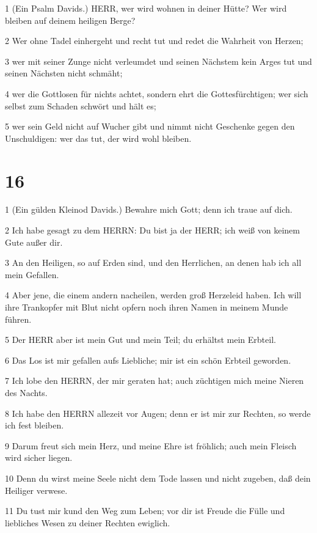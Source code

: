\par 1 (Ein Psalm Davids.) HERR, wer wird wohnen in deiner Hütte? Wer wird bleiben auf deinem heiligen Berge?
\par 2 Wer ohne Tadel einhergeht und recht tut und redet die Wahrheit von Herzen;
\par 3 wer mit seiner Zunge nicht verleumdet und seinen Nächstem kein Arges tut und seinen Nächsten nicht schmäht;
\par 4 wer die Gottlosen für nichts achtet, sondern ehrt die Gottesfürchtigen; wer sich selbst zum Schaden schwört und hält es;
\par 5 wer sein Geld nicht auf Wucher gibt und nimmt nicht Geschenke gegen den Unschuldigen: wer das tut, der wird wohl bleiben.

\chapter{16}

\par 1 (Ein gülden Kleinod Davids.) Bewahre mich Gott; denn ich traue auf dich.
\par 2 Ich habe gesagt zu dem HERRN: Du bist ja der HERR; ich weiß von keinem Gute außer dir.
\par 3 An den Heiligen, so auf Erden sind, und den Herrlichen, an denen hab ich all mein Gefallen.
\par 4 Aber jene, die einem andern nacheilen, werden groß Herzeleid haben. Ich will ihre Trankopfer mit Blut nicht opfern noch ihren Namen in meinem Munde führen.
\par 5 Der HERR aber ist mein Gut und mein Teil; du erhältst mein Erbteil.
\par 6 Das Los ist mir gefallen aufs Liebliche; mir ist ein schön Erbteil geworden.
\par 7 Ich lobe den HERRN, der mir geraten hat; auch züchtigen mich meine Nieren des Nachts.
\par 8 Ich habe den HERRN allezeit vor Augen; denn er ist mir zur Rechten, so werde ich fest bleiben.
\par 9 Darum freut sich mein Herz, und meine Ehre ist fröhlich; auch mein Fleisch wird sicher liegen.
\par 10 Denn du wirst meine Seele nicht dem Tode lassen und nicht zugeben, daß dein Heiliger verwese.
\par 11 Du tust mir kund den Weg zum Leben; vor dir ist Freude die Fülle und liebliches Wesen zu deiner Rechten ewiglich.

